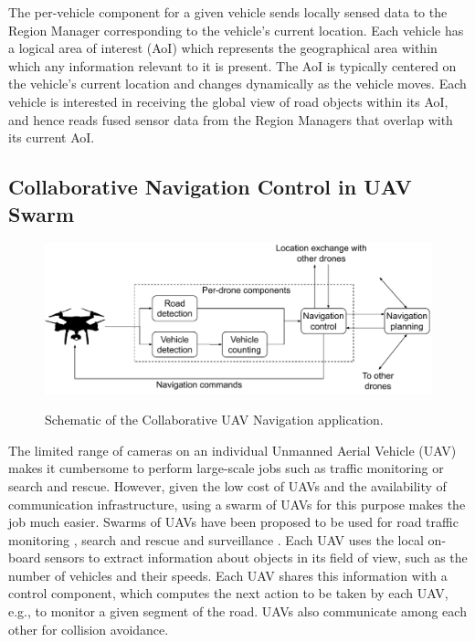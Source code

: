 \par The per-vehicle component for a given vehicle sends locally sensed data to the Region Manager corresponding to the vehicle's current location. Each vehicle has a logical area of interest (AoI) which represents the geographical area within which any information relevant to it is present. The AoI is typically centered on the vehicle's current location and changes dynamically as the vehicle moves. Each vehicle is interested in receiving the global view of road objects within its AoI, and hence reads fused sensor data from the Region Managers that overlap with its current AoI.

\subsection{Collaborative Navigation Control in UAV Swarm}
\begin{figure}[h]
\centering
\includegraphics[width=0.75\columnwidth]{figures/apps/collab_drone_navigation}
\label{fig:collab_drone_navig}
\caption{Schematic of the Collaborative UAV Navigation application.}
\end{figure}

The limited range of cameras on an individual Unmanned Aerial Vehicle (UAV) makes it cumbersome to perform large-scale jobs such as traffic monitoring or search and rescue. However, given the low cost of UAVs and the availability of communication infrastructure, using a swarm of UAVs for this purpose makes the job much easier. Swarms of UAVs have been proposed to be used for road traffic monitoring \cite{huang2021decentralized}, search and rescue \cite{scherer2015autonomous} and surveillance \cite{meng2015skystitch}. Each UAV uses the local on-board sensors to extract information about objects in its field of view, such as the number of vehicles and their speeds. Each UAV shares this information with a control component, which computes the next action to be taken by each UAV, e.g., to monitor a given segment of the road. UAVs also communicate among each other for collision avoidance.

